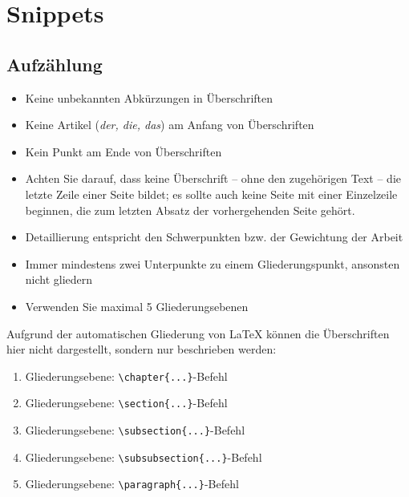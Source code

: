 \label{sec: Snippets}

\chapter{Snippets}
\section{Aufzählung}
\begin{itemize}
	\item Keine unbekannten Abkürzungen in Überschriften
	\item Keine Artikel (\textit{der, die, das}) am Anfang von Überschriften
	\item Kein Punkt am Ende von Überschriften
	\item Achten Sie darauf, dass keine Überschrift – ohne den zugehörigen Text – die letzte Zeile einer Seite bildet; es sollte auch keine Seite mit einer Einzelzeile beginnen, die zum letzten Absatz der vorhergehenden Seite gehört.
	\item Detaillierung entspricht den Schwerpunkten bzw. der Gewichtung der Arbeit
	\item Immer mindestens zwei Unterpunkte zu einem Gliederungspunkt, ansonsten nicht gliedern
	\item Verwenden Sie maximal 5 Gliederungsebenen	
\end{itemize}
Aufgrund der automatischen Gliederung von {\LaTeX} können die Überschriften hier nicht dargestellt, sondern nur beschrieben werden:
\begin{enumerate}
	\item	Gliederungsebene: \verb|\chapter{...}|-Befehl
	\item	Gliederungsebene: \verb|\section{...}|-Befehl
	\item	Gliederungsebene: \verb|\subsection{...}|-Befehl
	\item	Gliederungsebene: \verb|\subsubsection{...}|-Befehl
	\item	Gliederungsebene: \verb|\paragraph{...}|-Befehl
\end{enumerate}
\newpage
